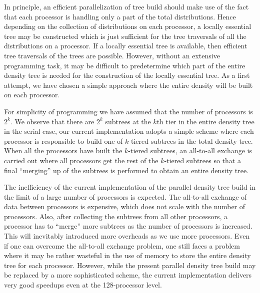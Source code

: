 \commentoutA{\documentclass[prl,aps,twocolumn,twocolumngrid,superbib]{revtex4}}
\begin{document}
In principle, an efficient parallelization of tree build should make
use of the fact that each processor is handling only a part of the
total distributions.  Hence depending on the collection of
distributions on each processor, a locally essential tree may be
constructed which is just sufficient for the tree traversals of all
the distributions on a processor\cite{CGan03}.  If a locally essential
tree is available, then efficient tree traversals of the trees are
possible.  However, without an extensive programming task,
it may be difficult to predetermine which part of
the entire density tree is needed for the construction of the locally
essential tree. As a first attempt, we have chosen a simple approach
where the entire density will be built on each processor.

For simplicity of programming we have assumed that the number of
processors is $2^k$. We observe that there are $2^k$ subtrees at the
$k$th tier in the entire density tree in the serial case, our current
implementation adopts a simple scheme where each processor is
responsible to build one of $k$-tiered subtrees in the total density
tree. When all the processors have built the $k$-tiered subtrees, an
all-to-all exchange is carried out where all processors get the rest
of the $k$-tiered subtrees so that a final ``merging'' up of the
subtrees\cite{MChallacombe97,CJ2004} is performed to obtain an entire
density tree.

The inefficiency of the current implementation of the parallel density
tree build in the limit of a large number of processors is expected.
The all-to-all exchange of data between processors is expensive,
which does not scale with the number of processors. Also, after
collecting the subtrees from all other processors, a processor has to
``merge'' more subtrees as the number of processors is increased. This
will inevitably introduced more overheads as we use more processors.
Even if one can overcome the all-to-all exchange problem, one still
faces a problem where it may be rather wasteful in the use of memory
to store the entire density tree for each processor.  However, while
the present parallel density tree build may be replaced by a more
sophisticated scheme, the current implementation delivers very good
speedups even at the 128-processor level.
\end{document}
